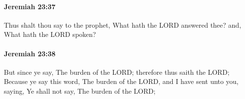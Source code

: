 		\paragraph{Jeremiah 23:37} %
			\label{JEREMIAH-23-37}

			Thus shalt thou say to the prophet, What hath the LORD answered thee? and, What hath the LORD spoken?


		\paragraph{Jeremiah 23:38} %
			\label{JEREMIAH-23-38}

			But since ye say, The burden of the LORD; therefore thus saith the LORD; Because ye say this word, The burden of the LORD, and I have sent unto you, saying, Ye shall not say, The burden of the LORD;


